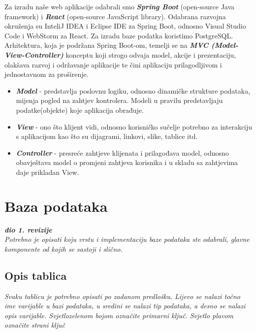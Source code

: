 Za izradu naše web aplikacije odabrali smo \textit{\textbf{Spring Boot}} (open-source Java framework) i \textit{\textbf{React}} (open-source JavaScript library). Odabrana razvojna okruženja su InteliJ IDEA i Eclipse IDE za Spring Boot, odnosno Visual Studio Code i WebStorm za React. Za izradu baze podatka koristimo PostgreSQL.
Arhitektura, koja je podržana Spring Boot-om, temelji se na \textit{\textbf{MVC (Model-View-Controller)}} konceptu koji strogo odvaja model, akcije i prezentaciju, olakšava razvoj i održavanje aplikacije te čini aplikaciju prilagodljivom i jednostavnom za proširenje.
\begin{itemize}
	\item \textit{\textbf{Model}} - predstavlja poslovnu logiku, odnosno dinamičke strukture podataka, mijenja pogled na zahtjev kontrolera. Modeli u pravilu predstavljaju podatke(objekte) koje aplikacija obrađuje.
	\item \textit{\textbf{View}} - ono što klijent vidi, odnosno korisničko sučelje potrebno za interakciju s aplikacijom kao što su dijagrami, linkovi, slike, tablice itd.
	\item \textit{\textbf{Controller}} - presreće zahtjeve klijenata i prilagođava model, odnosno obavještava model o promjeni zahtjeva korisnika i u skladu sa zahtjevima daje prikladan View.
\end{itemize}




\section{Baza podataka}

\textbf{\textit{dio 1. revizije}}\\

\textit{Potrebno je opisati koju vrstu i implementaciju baze podataka ste odabrali, glavne komponente od kojih se sastoji i slično.}

\subsection{Opis tablica}


\textit{Svaku tablicu je potrebno opisati po zadanom predlošku. Lijevo se nalazi točno ime varijable u bazi podataka, u sredini se nalazi tip podataka, a desno se nalazi opis varijable. Svjetlozelenom bojom označite primarni ključ. Svjetlo plavom označite strani ključ}


